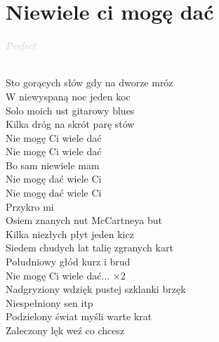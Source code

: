 \documentclass[a5paper, 10pt]{book}
\begin{document}
\section{Niewiele ci mogę dać}\textcolor{lightgray}{\textit{Perfect}}\\~\\
\begin{minipage}[t]{0.7\textwidth}
  Sto gorących słów gdy na dworze mróz\\
  W niewyspaną noc jeden koc\\
  Solo moich ust gitarowy blues\\
  Kilka dróg na skrót parę stów\\

  \hspace*{5mm}Nie mogę Ci wiele dać\\
  \hspace*{5mm}Nie mogę Ci wiele dać\\
  \hspace*{5mm}Bo sam niewiele mam\\
  \hspace*{5mm}Nie mogę dać wiele Ci\\
  \hspace*{5mm}Nie mogę dać wiele Ci\\
  \hspace*{5mm}Przykro mi\\

  Osiem znanych nut McCartneya but\\
  Kilka niezłych płyt jeden kicz\\
  Siedem chudych lat talię zgranych kart\\
  Południowy głód kurz i brud\\

  \hspace*{5mm}Nie mogę Ci wiele dać... $\times 2$\\

  Nadgryziony wdzięk pustej szklanki brzęk\\
  Niespełniony sen itp\\
  Podzielony świat myśli warte krat\\
  Zaleczony lęk weź co chcesz\\
\end{minipage}
\end{document}
